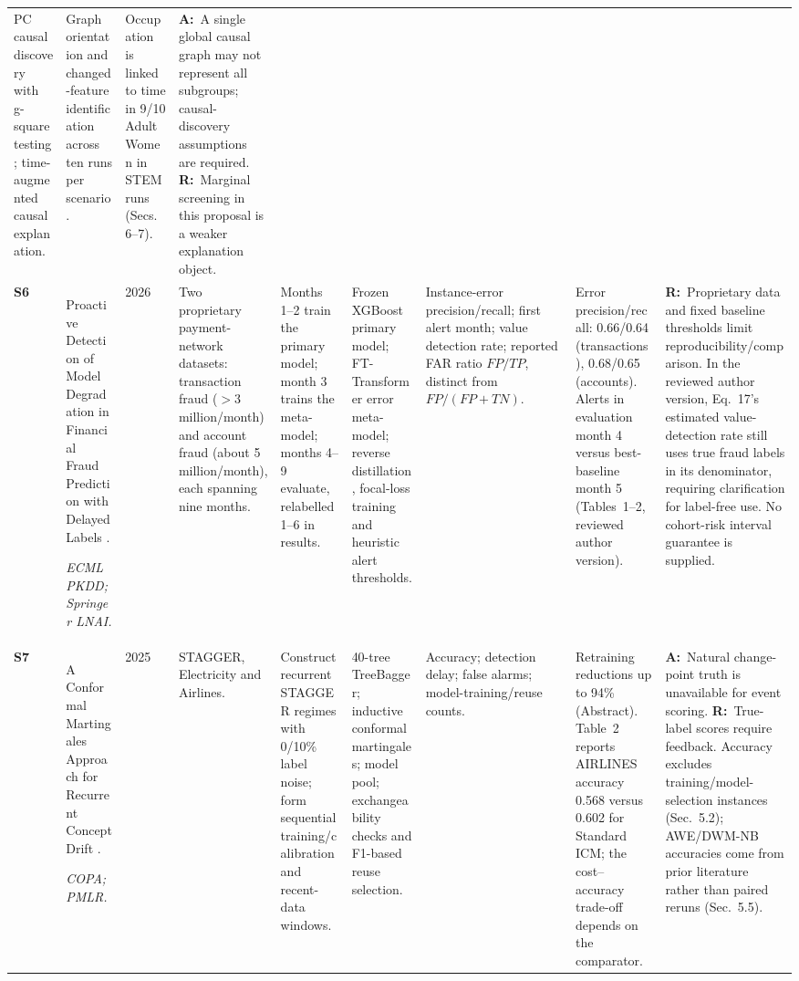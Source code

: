 \documentclass[11pt,a4paper]{article}
\newcommand{\A}{\textbf{A:}\ }
\newcommand{\R}{\textbf{R:}\ }
\begin{document}
\begin{landscape}
\begin{longtable}{L{0.65cm}L{4.0cm}L{0.85cm}L{2.9cm}L{2.8cm}L{2.8cm}L{2.4cm}L{3.0cm}L{4.2cm}}
PC causal discovery with g-square testing; time-augmented causal explanation. &
Graph orientation and changed-feature identification across ten runs per scenario. &
Occupation is linked to time in 9/10 Adult Women in STEM runs (Secs.~6--7). &
\A A single global causal graph may not represent all subgroups; causal-discovery assumptions are required.
\R Marginal screening in this proposal is a weaker explanation object.\\
\addlinespace[5pt]
\textbf{S6} &
Proactive Detection of Model Degradation in Financial Fraud Prediction with Delayed Labels \cite{prodem}.
\par\emph{ECML PKDD; Springer LNAI.} &
2026 &
Two proprietary payment-network datasets: transaction fraud ($>3$ million/month) and account fraud (about 5 million/month), each spanning nine months. &
Months 1--2 train the primary model; month 3 trains the meta-model; months 4--9 evaluate, relabelled 1--6 in results. &
Frozen XGBoost primary model; FT-Transformer error meta-model; reverse distillation, focal-loss training and heuristic alert thresholds. &
Instance-error precision/recall; first alert month; value detection rate; reported FAR ratio $FP/TP$, distinct from $FP/(FP+TN)$. &
Error precision/recall: 0.66/0.64 (transactions), 0.68/0.65 (accounts). Alerts in evaluation month 4 versus best-baseline month 5 (Tables~1--2, reviewed author version). &
\R Proprietary data and fixed baseline thresholds limit reproducibility/comparison. In the reviewed author version, Eq.~17's estimated value-detection rate still uses true fraud labels in its denominator, requiring clarification for label-free use. No cohort-risk interval guarantee is supplied.\\
\addlinespace[5pt]
\textbf{S7} &
A Conformal Martingales Approach for Recurrent Concept Drift \cite{conformal}.
\par\emph{COPA; PMLR.} &
2025 &
STAGGER, Electricity and Airlines. &
Construct recurrent STAGGER regimes with 0/10\% label noise; form sequential training/calibration and recent-data windows. &
40-tree TreeBagger; inductive conformal martingales; model pool; exchangeability checks and F1-based reuse selection. &
Accuracy; detection delay; false alarms; model-training/reuse counts. &
Retraining reductions up to 94\% (Abstract). Table~2 reports AIRLINES accuracy 0.568 versus 0.602 for Standard ICM; the cost--accuracy trade-off depends on the comparator. &
\A Natural change-point truth is unavailable for event scoring.
\R True-label scores require feedback. Accuracy excludes training/model-selection instances (Sec.~5.2); AWE/DWM-NB accuracies come from prior literature rather than paired reruns (Sec.~5.5).\\

\end{longtable}
\end{landscape}
\end{document}
